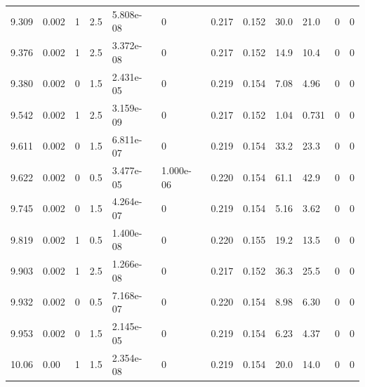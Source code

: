 \documentclass[preview]{standalone}
\begin{document}
{{{{\begin{tabular}{L{1.2cm}C{1.2cm} C{0.3cm}C{0.5cm} C{1.4cm}C{1.4cm} C{1.4cm}C{1.4cm} C{1.6cm}C{1.6cm} C{1.6cm}C{1.6cm}}
  9.309  &  0.002  & 1     & 2.5 &  5.808e-08  & 0  &  0.217&   0.152& 30.0 & 21.0   &  0 & 0  \\ 
  9.376  &  0.002  & 1     & 2.5 &  3.372e-08  & 0  &  0.217&   0.152& 14.9 & 10.4   &  0 & 0  \\ 
  9.380  &  0.002  & 0     & 1.5 &  2.431e-05  & 0  &  0.219&   0.154& 7.08 & 4.96   &  0 & 0  \\ 
  9.542  &  0.002  & 1     & 2.5 &  3.159e-09  & 0  &  0.217&   0.152& 1.04 & 0.731   &  0 & 0  \\ 
  9.611  &  0.002  & 0     & 1.5 &  6.811e-07  & 0  &  0.219&   0.154& 33.2 & 23.3   &  0 & 0  \\ 
  9.622  &  0.002  & 0     & 0.5 &  3.477e-05  & 1.000e-06  &  0.220&   0.154& 61.1 & 42.9   &  0 & 0  \\ 
  9.745  &  0.002  & 0     & 1.5 &  4.264e-07  & 0  &  0.219&   0.154& 5.16 & 3.62   &  0 & 0  \\ 
  9.819  &  0.002  & 1     & 0.5 &  1.400e-08  & 0  &  0.220&   0.155& 19.2 & 13.5   &  0 & 0  \\ 
  9.903  &  0.002  & 1     & 2.5 &  1.266e-08  & 0  &  0.217&   0.152& 36.3 & 25.5   &  0 & 0  \\ 
  9.932  &  0.002  & 0     & 0.5 &  7.168e-07  & 0  &  0.220&   0.154& 8.98 & 6.30   &  0 & 0  \\ 
  9.953  &  0.002  & 0     & 1.5 &  2.145e-05  & 0  &  0.219&   0.154& 6.23 & 4.37   &  0 & 0  \\ 
  10.06  &  0.00  & 1     & 1.5 &  2.354e-08  & 0  &  0.219&   0.154& 20.0 & 14.0   &  0 & 0  \\ 
\hline 
\end{tabular} 

}}}}
\end{document}
